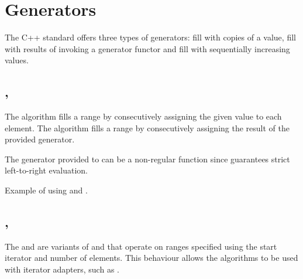 \section{Generators}

The C++ standard offers three types of generators: fill with copies of a value, fill with results of invoking a generator functor and fill with sequentially increasing values.

\subsection{\texorpdfstring{, }{\texttt{std::fill}, \texttt{std::generate}}}

The  algorithm fills a range by consecutively assigning the given value to each element.
The  algorithm fills a range by consecutively assigning the result of the provided generator.



The generator provided to  can be a non-regular function since  guarantees strict left-to-right evaluation.

\begin{box-note}
\footnotesize Example of using  and .
\tcblower
{}
\end{box-note}

\subsection{\texorpdfstring{, }{\texttt{std::fill\_n}, \texttt{std::generate\_n}}}

The  and  are variants of  and  that operate on ranges specified using the start iterator and number of elements. This behaviour allows the algorithms to be used with iterator adapters, such as .


